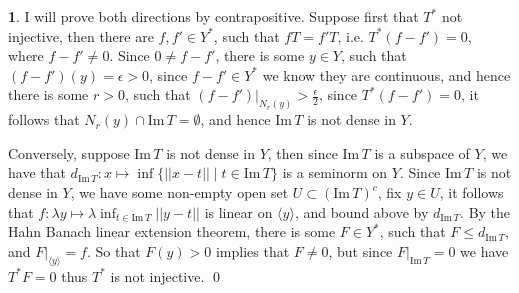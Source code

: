 \documentclass[10.5pt]{article}
\theoremstyle{definition}
\newtheorem{pb}{}
\newcommand{\set}[1]{\{#1\}}
\newcommand{\norm}[1]{\lvert\lvert#1\rvert\rvert}
\newcommand{\im}{\text{Im}}
\newcommand{\gen}[1]{\langle #1 \rangle}
\begin{document}
    \begin{pb}
        I will prove both directions by contrapositive. Suppose first that \(T^*\) not injective, then there are \(f,f' \in Y^*\), such that \(fT = f'T\), i.e. \(T^*(f - f') = 0\), where \(f-f' \neq 0\). Since \(0 \neq f - f'\), there is some \(y \in Y\), such that \((f - f')(y) = \epsilon > 0\), since \(f-f' \in Y^*\) we know they are continuous, and hence there is some \(r>0\), such that \((f-f')\vert_{N_r(y)} > \frac{\epsilon}{2}\), since \(T^*(f-f') = 0\), it follows that \(N_r(y) \cap \im\, T = \emptyset\), and hence \(\im\,T\) is not dense in \(Y\).

        Conversely, suppose \(\im\, T\) is not dense in \(Y\), then since \(\im\,T\) is a subspace of \(Y\), we have that \(d_{\im\,T}:x \mapsto \inf\set{\norm{x-t}\mid t \in \im\,T}\) is a seminorm on \(Y\). Since \(\im\,T\) is not dense in \(Y\), we have some non-empty open set \(U \subset (\im\,T)^c\), fix \(y \in U\), it follows that \(f: \lambda y\mapsto \lambda\inf_{t \in \im\,T}\norm{y - t}\) is linear on \(\gen{y}\), and bound above by \(d_{\im\,T}\). By the Hahn Banach linear extension theorem, there is some \(F \in Y^*\), such that \(F \leq d_{\im\,T}\), and \(F\vert_{\gen{y}} = f\). So that \(F(y) > 0\) implies that \(F \neq 0\), but since \(F\vert_{\im\,T} = 0\) we have \(T^*F = 0\) thus \(T^*\) is not injective. \qed
    \end{pb}
\end{document}
